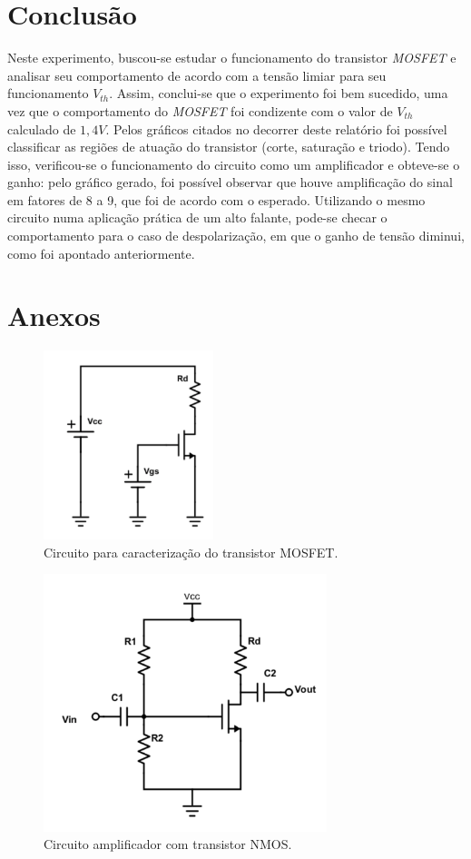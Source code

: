 \documentclass{article}
\begin{document}
\section{Conclusão}
Neste experimento, buscou-se estudar o funcionamento do transistor \emph{MOSFET} e analisar seu comportamento de acordo com a tensão limiar para seu funcionamento $V_{th}$. Assim, conclui-se que o experimento foi bem sucedido, uma vez que o comportamento do \emph{MOSFET} foi condizente com o valor de $V_{th}$ calculado de $1,4V$. Pelos gráficos citados no decorrer deste relatório foi possível classificar as regiões de atuação do transistor (corte, saturação e triodo).
Tendo isso, verificou-se o funcionamento do circuito como um amplificador e obteve-se o ganho: pelo gráfico gerado, foi possível observar que houve amplificação do sinal em fatores de 8 a 9, que foi de acordo com o esperado.
Utilizando o mesmo circuito numa aplicação prática de um alto falante, pode-se checar o comportamento para o caso de despolarização, em que o ganho de tensão diminui, como foi apontado anteriormente.

\nocite{*}



\newpage
\section*{Anexos}

\begin{figure}[h!]
    \centering
    \includegraphics[height=5.5cm]{imgSource/circuito1.png}
    \caption{Circuito para caracterização do transistor MOSFET.}
    \label{fig:circ1}
\end{figure}

\begin{figure}[h!]
    \centering
    \includegraphics[height=7.5cm]{imgSource/circuito2.png}
    \caption{Circuito amplificador com transistor NMOS.}
    \label{fig:circ2}
\end{figure}
\end{document}
